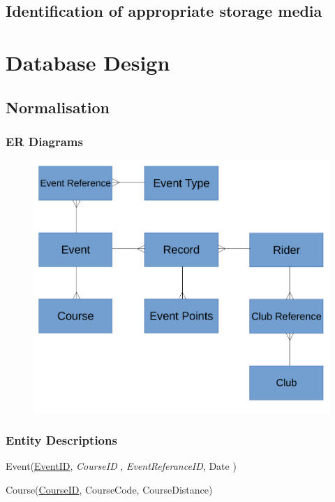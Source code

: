 \subsection{Identification of appropriate storage media}

\section{Database Design}

\subsection{Normalisation}

\subsubsection{ER Diagrams}
\begin{figure}[H]
    \includegraphics[width=\textwidth]{./ER/ERDesing.pdf}
\end{figure}

\subsubsection{Entity Descriptions}

Event(\underline{EventID}, \emph{CourseID} , \emph{EventReferanceID}, Date )

Course(\underline{CourseID}, CourseCode, CourseDistance)

